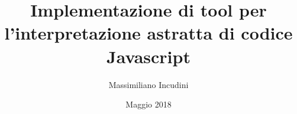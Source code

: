 \documentclass[openany,oneside]{book}
\title{Implementazione di tool per l'interpretazione astratta di codice Javascript }
\author{Massimiliano Incudini}
\date{Maggio 2018}
\theoremstyle{definition}
\begin{document}
\maketitle

\setcounter{tocdepth}{1}
\tableofcontents






\begin{appendices}

\end{appendices}

\printbibliography
\end{document}
